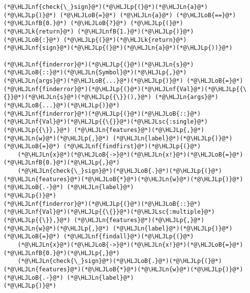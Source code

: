 \documentclass[12pt,a4paper]{article}
\newcommand{\HLJLk}[1]{\textcolor[RGB]{148,91,176}{\textbf{#1}}}
\newcommand{\HLJLn}[1]{#1}
\newcommand{\HLJLnf}[1]{\textcolor[RGB]{66,102,213}{#1}}
\newcommand{\HLJLsc}[1]{\textcolor[RGB]{201,61,57}{#1}}
\newcommand{\HLJLnfB}[1]{\textcolor[RGB]{59,151,46}{#1}}
\newcommand{\HLJLoB}[1]{\textcolor[RGB]{102,102,102}{\textbf{#1}}}
\newcommand{\HLJLp}[1]{#1}
\begin{document}
\begin{lstlisting}
(*@\HLJLnf{check{\_}sign}@*)(*@\HLJLp{(}@*)(*@\HLJLn{a}@*)(*@\HLJLp{)}@*) (*@\HLJLoB{=}@*) (*@\HLJLn{a}@*) (*@\HLJLoB{==}@*) (*@\HLJLnfB{0.}@*) (*@\HLJLoB{?}@*) (*@\HLJLp{(}@*)(*@\HLJLk{return}@*) (*@\HLJLnfB{1.}@*)(*@\HLJLp{)}@*) (*@\HLJLoB{:}@*) (*@\HLJLp{(}@*)(*@\HLJLk{return}@*) (*@\HLJLnf{sign}@*)(*@\HLJLp{(}@*)(*@\HLJLn{a}@*)(*@\HLJLp{))}@*)

(*@\HLJLnf{finderror}@*)(*@\HLJLp{(}@*)(*@\HLJLn{s}@*)(*@\HLJLoB{::}@*)(*@\HLJLn{Symbol}@*)(*@\HLJLp{,}@*) (*@\HLJLn{args}@*)(*@\HLJLoB{...}@*)(*@\HLJLp{)}@*) (*@\HLJLoB{=}@*) (*@\HLJLnf{finderror}@*)(*@\HLJLp{(}@*)(*@\HLJLnf{Val}@*)(*@\HLJLp{{\{}}@*)(*@\HLJLn{s}@*)(*@\HLJLp{{\}}(),}@*) (*@\HLJLn{args}@*)(*@\HLJLoB{...}@*)(*@\HLJLp{)}@*)
(*@\HLJLnf{finderror}@*)(*@\HLJLp{(}@*)(*@\HLJLoB{::}@*)(*@\HLJLnf{Val}@*)(*@\HLJLp{{\{}}@*)(*@\HLJLsc{:single}@*)(*@\HLJLp{{\}},}@*) (*@\HLJLn{features}@*)(*@\HLJLp{,}@*) (*@\HLJLn{w}@*)(*@\HLJLp{,}@*) (*@\HLJLn{label}@*)(*@\HLJLp{)}@*) (*@\HLJLoB{=}@*) (*@\HLJLnf{findfirst}@*)(*@\HLJLp{(}@*)
    (*@\HLJLn{x}@*)(*@\HLJLoB{->}@*)(*@\HLJLn{x!}@*)(*@\HLJLoB{=}@*)(*@\HLJLnfB{0.}@*)(*@\HLJLp{,}@*) 
    (*@\HLJLn{check{\_}sign}@*)(*@\HLJLoB{.}@*)(*@\HLJLp{(}@*)(*@\HLJLn{features}@*)(*@\HLJLoB{*}@*)(*@\HLJLn{w}@*)(*@\HLJLp{)}@*) (*@\HLJLoB{.-}@*) (*@\HLJLn{label}@*)
(*@\HLJLp{)}@*)
(*@\HLJLnf{finderror}@*)(*@\HLJLp{(}@*)(*@\HLJLoB{::}@*)(*@\HLJLnf{Val}@*)(*@\HLJLp{{\{}}@*)(*@\HLJLsc{:multiple}@*)(*@\HLJLp{{\}},}@*) (*@\HLJLn{features}@*)(*@\HLJLp{,}@*) (*@\HLJLn{w}@*)(*@\HLJLp{,}@*) (*@\HLJLn{label}@*)(*@\HLJLp{)}@*) (*@\HLJLoB{=}@*) (*@\HLJLnf{findall}@*)(*@\HLJLp{(}@*)
    (*@\HLJLn{x}@*)(*@\HLJLoB{->}@*)(*@\HLJLn{x!}@*)(*@\HLJLoB{=}@*)(*@\HLJLnfB{0.}@*)(*@\HLJLp{,}@*) 
    (*@\HLJLn{check{\_}sign}@*)(*@\HLJLoB{.}@*)(*@\HLJLp{(}@*)(*@\HLJLn{features}@*)(*@\HLJLoB{*}@*)(*@\HLJLn{w}@*)(*@\HLJLp{)}@*) (*@\HLJLoB{.-}@*) (*@\HLJLn{label}@*)
(*@\HLJLp{)}@*)


\end{lstlisting}
\end{document}
